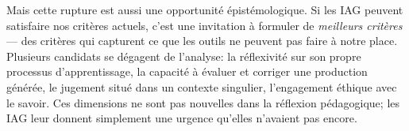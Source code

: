 Mais cette rupture est aussi une opportunité épistémologique. 
Si les IAG peuvent satisfaire nos critères actuels, c'est une invitation à formuler de \emph{meilleurs critères} --- des critères qui capturent ce que les outils ne peuvent pas faire à notre place. 
Plusieurs candidats se dégagent de l'analyse: la réflexivité sur son propre processus d'apprentissage, la capacité à évaluer et corriger une production générée, le jugement situé dans un contexte singulier, l'engagement éthique avec le savoir. 
Ces dimensions ne sont pas nouvelles dans la réflexion pédagogique; les IAG leur donnent simplement une urgence qu'elles n'avaient pas encore.